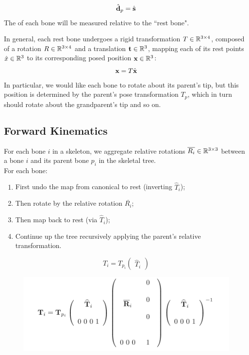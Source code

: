 \documentclass[11pt]{article}
\numberwithin{equation}{section}
\begin{document}
\begin{equation}
	\hat{\textbf{d}}_p = \hat{\textbf{s}}
\end{equation}
\remark
The  of each bone will be measured relative to the ``rest bone".

In general, each rest bone undergoes a rigid transformation $T \in \mathbb{R}^{3\times 4}$, composed of a rotation $R \in \mathbb{R}^{3 \times 4}$ and a translation $\textbf{t} \in \mathbb{R}^3$, mapping each of its rest points $\hat{x} \in \mathbb{R}^3$ to its corresponding posed position $\textbf{x} \in \mathbb{R}^3$:
\begin{equation}
	\textbf{x} = T\hat{\textbf{x}}
\end{equation}
\remark
In particular, we would like each bone to rotate about its parent's tip, but this position is determined by the parent's pose transformation $T_p$, which in turn should rotate about the grandparent's tip and so on.

\subsection{Forward Kinematics}
For each bone $i$ in a skeleton, we aggregate relative rotations $\overline{R_i} \in \mathbb{R}^{3\times 3}$ between a bone $i$ and its parent bone $p_i$ in the skeletal tree.\\
For each bone:
\begin{enumerate}
	\item First undo the map from canonical to rest (inverting $\hat{T}_i$);
	\item Then rotate by the relative rotation $\overline{R_i}$;
	\item Then map back to rest (via $\hat{T}_i$);
	\item Continue up the tree recursively applying the parent's relative transformation.
\end{enumerate}
\begin{equation}
	T_i = T_{p_i}\begin{pmatrix}
		\hat{T}_i 
	\end{pmatrix}
\end{equation}
\begin{figure}[H]
	\centering
	\includegraphics[scale=0.5]{p41}
\end{figure}
\end{document}
